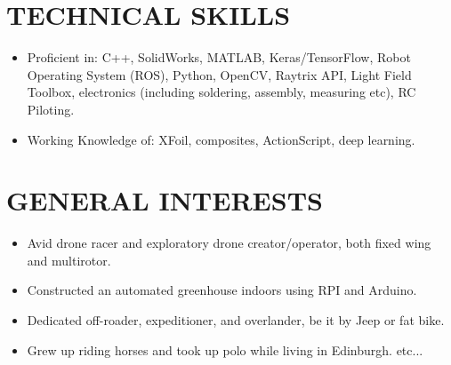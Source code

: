 \documentclass[10pt]{res} %
\begin{document}
\begin{resume}
\section{TECHNICAL SKILLS}
\begin{itemize} \itemsep -2pt
\item Proficient in: C++, SolidWorks, MATLAB, Keras/TensorFlow, Robot Operating System (ROS), Python, OpenCV, Raytrix API, Light Field Toolbox, electronics (including soldering, assembly, measuring etc), RC Piloting.
\item Working Knowledge of: XFoil, composites, ActionScript, deep learning.
\end{itemize}
\vspace*{-\baselineskip}

\section{GENERAL INTERESTS}
\begin{itemize} \itemsep -2pt
\item Avid drone racer and exploratory drone creator/operator, both fixed wing and multirotor. 
\item Constructed an automated greenhouse indoors using RPI and Arduino.
\item Dedicated off-roader, expeditioner, and overlander, be it by Jeep or fat bike.
\item Grew up riding horses and took up polo while living in Edinburgh. etc...
\end{itemize}


\end{resume} 
\end{document}
